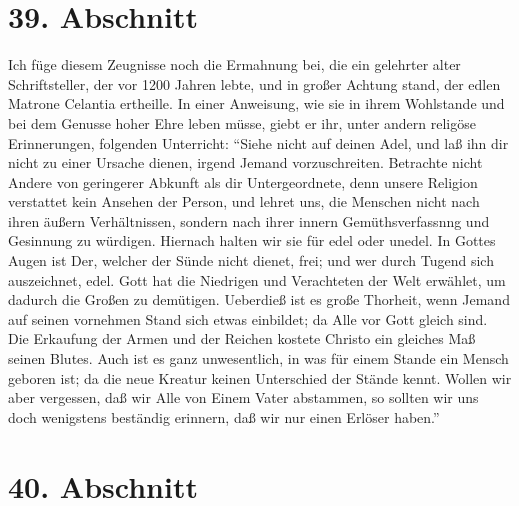 \section{39. Abschnitt}

Ich füge diesem Zeugnisse noch die Ermahnung bei, die ein gelehrter alter
Schriftsteller, der vor 1200 Jahren lebte, und in großer Achtung stand, der
edlen Matrone Celantia ertheille. In einer Anweisung, wie sie in ihrem
Wohlstande und bei dem Genusse hoher Ehre leben müsse, giebt er ihr, unter
andern religöse Erinnerungen, folgenden Unterricht: "`Siehe nicht auf deinen
Adel, und laß ihn dir nicht zu einer Ursache dienen, irgend Jemand
vorzuschreiten. Betrachte nicht Andere von geringerer Abkunft als dir
Untergeordnete, denn unsere Religion verstattet kein Ansehen der Person, und
lehret uns, die Menschen nicht nach ihren äußern Verhältnissen, sondern nach
ihrer innern Gemüthsverfassnng und Gesinnung zu würdigen. Hiernach halten wir
sie für edel oder unedel. In Gottes Augen ist Der, welcher der Sünde nicht
dienet, frei; und wer durch Tugend sich auszeichnet, edel. Gott hat die
Niedrigen und Verachteten der Welt erwählet, um dadurch die Großen zu demütigen.
Ueberdieß ist es große Thorheit, wenn Jemand auf seinen vornehmen Stand sich
etwas einbildet; da Alle vor Gott gleich sind. Die Erkaufung der Armen und der
Reichen kostete Christo ein gleiches Maß seinen Blutes. Auch ist es ganz
unwesentlich, in was für einem Stande ein Mensch geboren ist; da die neue
Kreatur keinen Unterschied der Stände kennt. Wollen wir aber vergessen, daß wir
Alle von Einem Vater abstammen, so sollten wir uns doch wenigstens beständig
erinnern, daß wir nur einen Erlöser haben."'

\section{40. Abschnitt}

